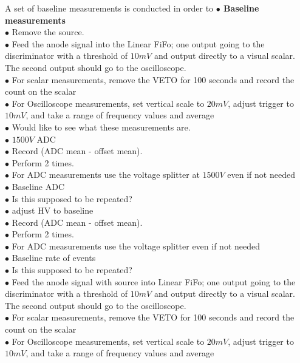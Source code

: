 A set of {\color{blue}baseline measurements} is conducted in order to 
\textbf{\color[rgb]{1,0.5,0}$\bullet$ Baseline measurements}\\
$\bullet$ Remove the source.\\
$\bullet$ Feed the anode signal into the Linear FiFo; one output going to the discriminator with a threshold of $10 mV$ and output directly to a visual scalar. The second output should go to the oscilloscope.\\
$\bullet$ For scalar measurements, remove the VETO for 100 seconds and record the count on the scalar\\
$\bullet$ For Oscilloscope measurements, set vertical scale to $20 mV$, adjust trigger to $10 mV$, and take a range of frequency values and average\\
{\color{blue}$\bullet$ Would like to see what these measurements are.}\\
$\bullet$ $1500 V$ ADC\\
$\bullet$ Record (ADC mean - offset mean).\\
$\bullet$ Perform 2 times.\\
$\bullet$ For ADC measurements use the voltage splitter at $1500 V$ even if not needed\\
$\bullet$ Baseline ADC\\
{\color{blue}$\bullet$ Is this supposed to be repeated?}\\
$\bullet$ adjust HV to baseline\\
$\bullet$ Record (ADC mean - offset mean).\\
$\bullet$ Perform 2 times.\\
$\bullet$ For ADC measurements use the voltage splitter even if not needed\\
$\bullet$ Baseline rate of events\\
{\color{blue}$\bullet$ Is this supposed to be repeated?}\\
$\bullet$ Feed the anode signal with source into Linear FiFo; one output going to the discriminator with a threshold of $10 mV$ and output directly to a visual scalar. The second output should go to the oscilloscope.\\
$\bullet$ For scalar measurements, remove the VETO for 100 seconds and record the count on the scalar\\
$\bullet$ For Oscilloscope measurements, set vertical scale to $20 mV$, adjust trigger to $10 mV$, and take a range of frequency values and average\\

